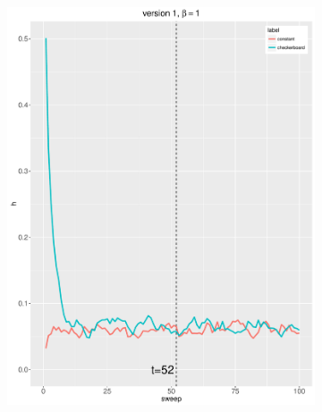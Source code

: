 \documentclass[12pt, oneside]{article}   	%
\begin{document}
\begin{figure}[H]
        \centering
        \begin{subfigure}[b]{0.475\textwidth}
            \centering
            \includegraphics[width=\textwidth, height=0.32\textheight]{v1_1.pdf}
        \end{subfigure}
        \quad
        \begin{subfigure}[b]{0.475\textwidth}
            \centering

\end{subfigure}
\end{figure}
\end{document}
